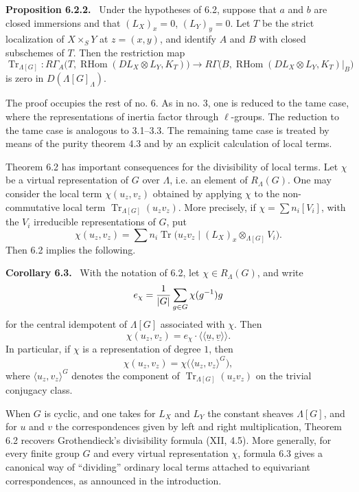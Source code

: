 \documentclass[11pt]{article}
\theoremstyle{plain}
\theoremstyle{definition}
\theoremstyle{remark}
\newenvironment{statement}[1]{\par\medskip\noindent\textbf{#1.}\ }{\par\medskip}
\DeclareMathOperator{\Tr}{Tr}
\DeclareMathOperator{\RHom}{RHom}
\begin{document}
\begin{statement}{Proposition 6.2.2}
Under the hypotheses of 6.2, suppose that $a$ and $b$ are closed immersions and that
$(L_X)_x=0$, $(L_Y)_y=0$. Let $T$ be the strict localization of
$X\times_S Y$ at $z=(x,y)$, and identify $A$ and $B$ with closed subschemes of
$T$. Then the restriction map
\[
\Tr_{\Lambda[G]}:
R\Gamma_A\bigl(T,\RHom(DL_X\otimes L_Y,K_T)\bigr)
\longrightarrow
R\Gamma\bigl(B,\RHom(DL_X\otimes L_Y,K_T)|_B\bigr)
\]
is zero in $D(\Lambda[G]_{\Lambda})$.
\end{statement}

The proof occupies the rest of no. 6. As in no. 3, one is reduced to the tame case,
where the representations of inertia factor through $\ell$-groups. The reduction to
the tame case is analogous to 3.1--3.3. The remaining tame case is treated by means
of the purity theorem 4.3 and by an explicit calculation of local terms.

Theorem 6.2 has important consequences for the divisibility of local terms. Let
$\chi$ be a virtual representation of $G$ over $\Lambda$, i.e. an element of
$R_\Lambda(G)$. One may consider the local term $\chi(u_z,v_z)$ obtained by
applying $\chi$ to the non-commutative local term
$\Tr_{\Lambda[G]}(u_zv_z)$. More precisely, if
$\chi=\sum n_i[V_i]$, with the $V_i$ irreducible representations of $G$, put
\[
   \chi(u_z,v_z)=\sum n_i\Tr\bigl(u_zv_z\mid (L_X)_x\otimes_{\Lambda[G]}V_i\bigr).
\]
Then 6.2 implies the following.

\begin{statement}{Corollary 6.3}
With the notation of 6.2, let $\chi\in R_\Lambda(G)$, and write
\[
     e_\chi={1\over |G|}\sum_{g\in G}\chi(g^{-1})g
\]
for the central idempotent of $\Lambda[G]$ associated with $\chi$. Then
\[
     \chi(u_z,v_z)=e_\chi\cdot
       \langle\!\langle \underline u,\underline v\rangle\!\rangle .
\]
In particular, if $\chi$ is a representation of degree $1$, then
\[
     \chi(u_z,v_z)=\chi\bigl(\langle u_z,v_z\rangle^G\bigr),
\]
where $\langle u_z,v_z\rangle^G$ denotes the component of
$\Tr_{\Lambda[G]}(u_zv_z)$ on the trivial conjugacy class.
\end{statement}

When $G$ is cyclic, and one takes for $L_X$ and $L_Y$ the constant sheaves
$\Lambda[G]$, and for $u$ and $v$ the correspondences given by left and right
multiplication, Theorem 6.2 recovers Grothendieck's divisibility formula (XII, 4.5).
More generally, for every finite group $G$ and every virtual representation $\chi$,
formula 6.3 gives a canonical way of ``dividing'' ordinary local terms attached to
equivariant correspondences, as announced in the introduction.
\end{document}
